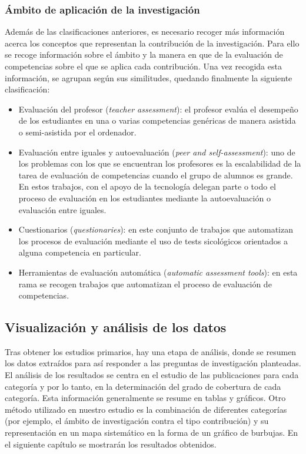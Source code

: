 \subsubsection{Ámbito de aplicación de la investigación}
Además de las clasificaciones anteriores, es necesario recoger más información acerca los conceptos que representan la contribución de la investigación. Para ello se recoge información sobre el ámbito y la manera en que de la evaluación de competencias sobre el que se aplica cada contribución. Una vez recogida esta información, se agrupan según sus similitudes, quedando finalmente la siguiente clasificación:
\begin{itemize}
\item Evaluación del profesor (\emph{teacher assessment}): el profesor evalúa el desempeño de los estudiantes en una o varias competencias genéricas de manera asistida o semi-asistida por el ordenador.
\item Evaluación entre iguales y autoevaluación (\emph{peer and self-assessment}): uno de los problemas con los que se encuentran los profesores es la escalabilidad de la tarea de evaluación de competencias cuando el grupo de alumnos es grande. En estos trabajos, con el apoyo de la tecnología delegan parte o todo el proceso de evaluación en los estudiantes mediante la autoevaluación o evaluación entre iguales.
\item Cuestionarios (\emph{questionaries}): en este conjunto de trabajos que automatizan los procesos de evaluación mediante el uso de tests sicológicos orientados a alguna competencia en particular.
\item Herramientas de evaluación automática (\emph{automatic assessment tools}): en esta rama se recogen trabajos que automatizan el proceso de evaluación de competencias.
\end{itemize}

\subsection{Visualización y análisis de los datos}
Tras obtener los estudios primarios, hay una etapa de análisis, donde se resumen los datos extraídos para así responder a las preguntas de investigación planteadas. El análisis de los resultados se centra en el estudio de las publicaciones para cada categoría y por lo tanto, en la determinación del grado de cobertura de cada categoría. Esta información generalmente se resume en tablas y gráficos. Otro método utilizado en nuestro estudio es la combinación de diferentes categorías (por ejemplo, el ámbito de investigación contra el tipo contribución) y su representación en un mapa sistemático en la forma de un gráfico de burbujas.
En el siguiente capítulo se mostrarán los resultados obtenidos.

